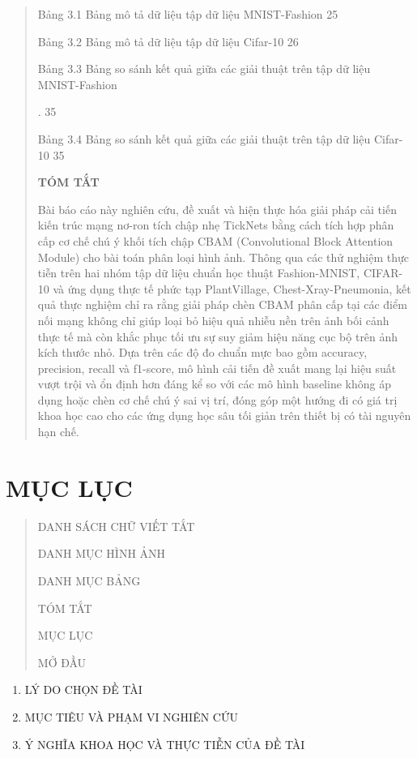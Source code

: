 \documentclass[
]{article}
\begin{document}
\begin{quote}
Bảng 3.1 Bảng mô tả dữ liệu tập dữ liệu MNIST-Fashion 25

Bảng 3.2 Bảng mô tả dữ liệu tập dữ liệu Cifar-10 26

Bảng 3.3 Bảng so sánh kết quả giữa các giải thuật trên tập dữ liệu
MNIST-Fashion

. 35

Bảng 3.4 Bảng so sánh kết quả giữa các giải thuật trên tập dữ liệu
Cifar-10 35

\textbf{TÓM TẮT}

Bài báo cáo này nghiên cứu, đề xuất và hiện thực hóa giải pháp cải tiến
kiến trúc mạng nơ-ron tích chập nhẹ TickNets bằng cách tích hợp phân cấp
cơ chế chú ý khối tích chập CBAM (Convolutional Block Attention Module)
cho bài toán phân loại hình ảnh. Thông qua các thử nghiệm thực tiễn trên
hai nhóm tập dữ liệu chuẩn học thuật Fashion-MNIST, CIFAR-10 và ứng dụng
thực tế phức tạp PlantVillage, Chest-Xray-Pneumonia, kết quả thực nghiệm
chỉ ra rằng giải pháp chèn CBAM phân cấp tại các điểm nối mạng không chỉ
giúp loại bỏ hiệu quả nhiễu nền trên ảnh bối cảnh thực tế mà còn khắc
phục tối ưu sự suy giảm hiệu năng cục bộ trên ảnh kích thước nhỏ. Dựa
trên các độ đo chuẩn mực bao gồm accuracy, precision, recall và
f1-score, mô hình cải tiến đề xuất mang lại hiệu suất vượt trội và ổn
định hơn đáng kể so với các mô hình baseline không áp dụng hoặc chèn cơ
chế chú ý sai vị trí, đóng góp một hướng đi có giá trị khoa học cao cho
các ứng dụng học sâu tối giản trên thiết bị có tài nguyên hạn chế.
\end{quote}

\section{MỤC LỤC}\label{mux1ee5c-lux1ee5c}

\begin{quote}
DANH SÁCH CHỮ VIẾT TẮT

DANH MỤC HÌNH ẢNH

DANH MỤC BẢNG

TÓM TẮT

MỤC LỤC

MỞ ĐẦU
\end{quote}

\begin{enumerate}
\def\labelenumi{\arabic{enumi}.}
\item
  LÝ DO CHỌN ĐỀ TÀI
\item
  MỤC TIÊU VÀ PHẠM VI NGHIÊN CỨU
\item
  Ý NGHĨA KHOA HỌC VÀ THỰC TIỄN CỦA ĐỀ TÀI
\end{enumerate}
\end{document}
